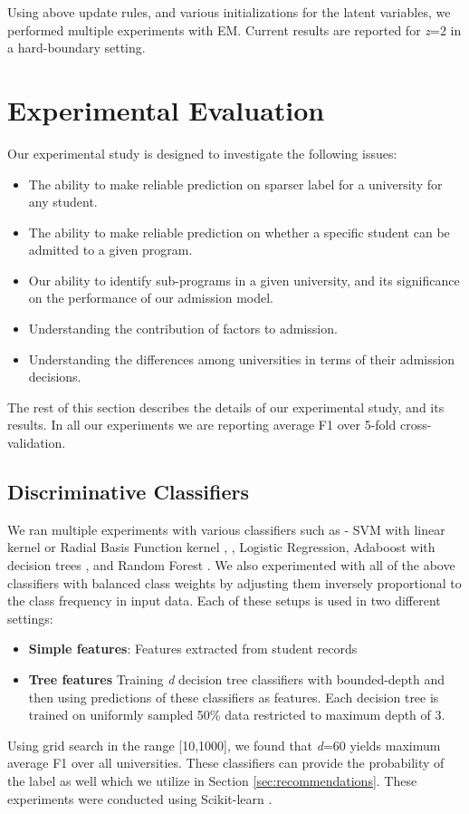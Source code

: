 \documentclass{sig-alternate-05-2015}
\begin{document}
Using above update rules, and various initializations for the latent variables, we performed multiple experiments with EM. Current results are reported for \textit{z}=2 in a hard-boundary setting.


\section{Experimental Evaluation}
\label{sec:experiments}
Our experimental study is designed to investigate the following issues:
\begin{itemize}
\item The ability to make reliable prediction on sparser label for a university for any student.
\item The ability to make reliable prediction on whether a specific student can be admitted to a given program.
\item Our ability to identify sub-programs in a given university, and its significance on the performance of our admission model.
\item Understanding the contribution of factors to admission.
\item Understanding the differences among universities in terms of their admission decisions.
\end{itemize}
The rest of this section describes the details of our experimental study, and its results. In all our experiments we are reporting average F1 over 5-fold cross-validation.

\subsection{Discriminative Classifiers}
\label{subsec:supervised-exp}
We ran multiple experiments with various classifiers such as - SVM with linear kernel or Radial Basis Function kernel \cite{libsvm}, \cite{svmtutorial}, Logistic Regression, Adaboost \cite{adaboost} with decision trees \cite{decisiontree}, and Random Forest \cite{randomforest}. We also experimented with all of the above classifiers with balanced class weights by adjusting them inversely proportional to the class frequency in input data. Each of these setups is used in two different settings:
\begin{itemize}
\item \textbf{Simple features}: Features extracted from student records
\item \textbf{Tree features} Training \textit{d} decision tree classifiers with bounded-depth and then using predictions of these classifiers as features. Each decision tree is trained on uniformly sampled 50\% data restricted to maximum depth of 3.
\end{itemize}
Using grid search in the range [10,1000], we found that \textit{d}=60 yields maximum average F1 over all universities. These classifiers can provide the probability of the label as well which we utilize in Section \ref{sec:recommendations}. These experiments were conducted using Scikit-learn \cite{scikit-learn}.
\end{document}
